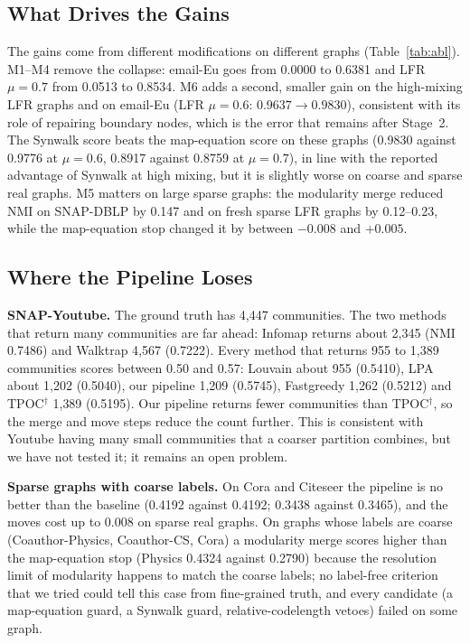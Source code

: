 \documentclass[conference]{IEEEtran}
\begin{document}
\subsection{What Drives the Gains}
The gains come from different modifications on different graphs (Table~\ref{tab:abl}). M1--M4 remove the collapse: email-Eu goes from 0.0000 to 0.6381 and LFR $\mu{=}0.7$ from 0.0513 to 0.8534. M6 adds a second, smaller gain on the high-mixing LFR graphs and on email-Eu (LFR $\mu{=}0.6$: $0.9637\to0.9830$), consistent with its role of repairing boundary nodes, which is the error that remains after Stage~2. The Synwalk score beats the map-equation score on these graphs (0.9830 against 0.9776 at $\mu{=}0.6$, 0.8917 against 0.8759 at $\mu{=}0.7$), in line with the reported advantage of Synwalk at high mixing, but it is slightly worse on coarse and sparse real graphs. M5 matters on large sparse graphs: the modularity merge reduced NMI on SNAP-DBLP by 0.147 and on fresh sparse LFR graphs by 0.12--0.23, while the map-equation stop changed it by between $-0.008$ and $+0.005$.

\subsection{Where the Pipeline Loses}
\textbf{SNAP-Youtube.} The ground truth has 4{,}447 communities. The two methods that return many communities are far ahead: Infomap returns about 2{,}345 (NMI 0.7486) and Walktrap 4{,}567 (0.7222). Every method that returns 955 to 1{,}389 communities scores between 0.50 and 0.57: Louvain about 955 (0.5410), LPA about 1{,}202 (0.5040), our pipeline 1{,}209 (0.5745), Fastgreedy 1{,}262 (0.5212) and TPOC$^{\dagger}$ 1{,}389 (0.5195). Our pipeline returns fewer communities than TPOC$^{\dagger}$, so the merge and move steps reduce the count further. This is consistent with Youtube having many small communities that a coarser partition combines, but we have not tested it; it remains an open problem.

\textbf{Sparse graphs with coarse labels.} On Cora and Citeseer the pipeline is no better than the baseline (0.4192 against 0.4192; 0.3438 against 0.3465), and the moves cost up to 0.008 on sparse real graphs. On graphs whose labels are coarse (Coauthor-Physics, Coauthor-CS, Cora) a modularity merge scores higher than the map-equation stop (Physics 0.4324 against 0.2790) because the resolution limit of modularity happens to match the coarse labels; no label-free criterion that we tried could tell this case from fine-grained truth, and every candidate (a map-equation guard, a Synwalk guard, relative-codelength vetoes) failed on some graph.
\end{document}
